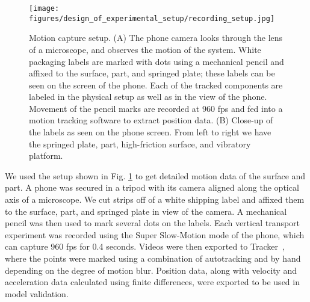 
\begin{figure}[tb]
    \centering
    \texttt{[image: figures/design\_of\_experimental\_setup/recording\_setup.jpg]}
    \caption{Motion capture setup. 
    (A) The phone camera looks through the lens of a microscope, and observes the motion of the system.
    White packaging labels are marked with dots using a mechanical pencil and affixed to the surface, part, and springed plate; these labels can be seen on the screen of the phone.
    Each of the tracked components are labeled in the physical setup as well as in the view of the phone.
    Movement of the pencil marks are recorded at 960 fps and fed into a motion tracking software to extract position data.
    (B) Close-up of the labels as seen on the phone screen.
    From left to right we have the springed plate, part, high-friction surface, and vibratory platform.}
    \label{figure: recording setup}
    \vspace{\shift}
\end{figure}
%

We used the setup shown in Fig. \ref{figure: recording setup} to get detailed motion data of the surface and part. 
%
A phone was secured in a tripod with its camera aligned along the optical axis of a microscope. 
%
We cut strips off of a white shipping label and affixed them to the surface, part, and springed plate in view of the camera.
%
A mechanical pencil was then used to mark several dots on the labels. 
%
Each vertical transport experiment was recorded using the Super Slow-Motion mode of the phone, which can capture 960 fps for 0.4 seconds. 
%
Videos were then exported to Tracker~\cite{brown2014tracker}, where the points were marked using a combination of autotracking and by hand depending on the degree of motion blur. 
%
Position data, along with velocity and acceleration data calculated using finite differences, were exported to be used in model validation.